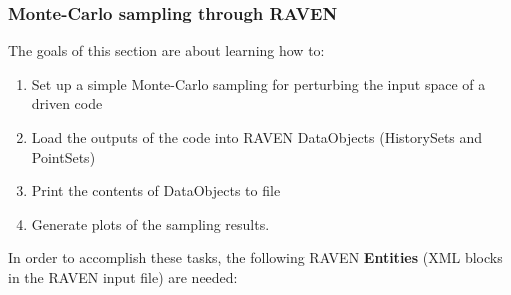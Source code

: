 \subsubsection{Monte-Carlo sampling through RAVEN}
\label{subsub:MCexample}
The goals of this section are about learning how to:
 \begin{enumerate}
   \item Set up a simple Monte-Carlo sampling for perturbing the input space of a driven code
   \item Load the outputs of the code into RAVEN DataObjects (HistorySets and PointSets)
   \item Print the contents of DataObjects to file
   \item Generate plots of the sampling results.
\end{enumerate}
In order to accomplish these tasks, the following RAVEN \textbf{Entities} (XML blocks in the RAVEN input file) are needed:
